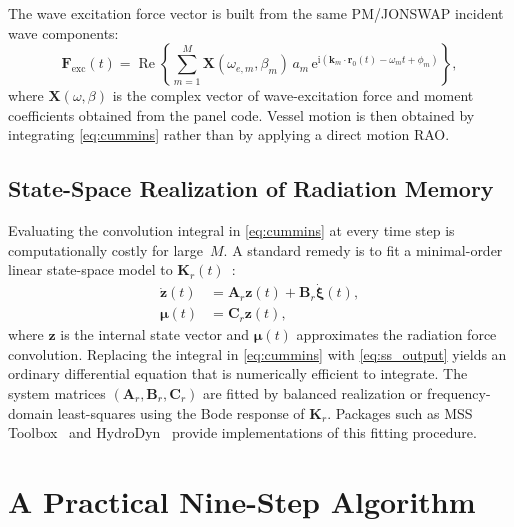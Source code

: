 \documentclass[journal,10pt,twocolumn]{IEEEtran}
\newcommand{\ii}{\mathrm{i}}
\newcommand{\ee}{\mathrm{e}}
\newcommand{\Real}{\operatorname{Re}}
\newcommand{\vect}[1]{\bm{#1}}
\begin{document}
    The wave excitation force vector is built from the same PM/JONSWAP incident wave
    components:
    \begin{equation}
        \vect{F}_{\mathrm{exc}}(t)
        = \Real\!\left\{
        \sum_{m=1}^{M}
        \vect{X}(\omega_{e,m},\beta_m)\,a_m\,
        \ee^{\ii(\vect{k}_m\cdot\vect{r}_0(t) - \omega_m t + \phi_m)}
        \right\},
        \label{eq:excitation}
    \end{equation}
    where $\vect{X}(\omega,\beta)$ is the complex vector of wave-excitation force and moment
    coefficients obtained from the panel code.
    Vessel motion is then obtained by integrating \eqref{eq:cummins} rather than by
    applying a direct motion RAO.

    \subsection{State-Space Realization of Radiation Memory}
    \label{sec:statespace}

    Evaluating the convolution integral in \eqref{eq:cummins} at every time step is
    computationally costly for large~$M$.
    A standard remedy is to fit a minimal-order linear state-space model to
    $\vect{K}_r(t)$~\cite{Perez}:
    \begin{align}
        \dot{\vect{z}}(t) &= \vect{A}_r\vect{z}(t) + \vect{B}_r\dot{\vect{\xi}}(t),
        \label{eq:ss_state} \\
        \vect{\mu}(t)     &= \vect{C}_r\vect{z}(t),
        \label{eq:ss_output}
    \end{align}
    where $\vect{z}$ is the internal state vector and $\vect{\mu}(t)$ approximates the
    radiation force convolution.
    Replacing the integral in \eqref{eq:cummins} with \eqref{eq:ss_output} yields an
    ordinary differential equation that is numerically efficient to integrate.
    The system matrices $(\vect{A}_r,\vect{B}_r,\vect{C}_r)$ are fitted by balanced
    realization or frequency-domain least-squares using the Bode response of $\vect{K}_r$.
    Packages such as MSS Toolbox~\cite{MSS} and HydroDyn~\cite{HydroDyn} provide
    implementations of this fitting procedure.

    \section{A Practical Nine-Step Algorithm}
    \label{sec:algorithm}
\end{document}
